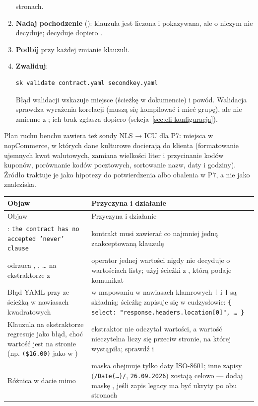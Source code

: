 \begin{enumerate}
        stronach.
  \item \textbf{Nadaj pochodzenie} (): klauzula 
        jest liczona i pokazywana, ale o niczym nie decyduje; decyduje dopiero
        .
  \item \textbf{Podbij } przy każdej zmianie klauzuli.
  \item \textbf{Zwaliduj}:
\begin{lstlisting}
sk validate contract.yaml secondkey.yaml
\end{lstlisting}
        Błąd walidacji wskazuje miejsce (ścieżkę w dokumencie) i powód. Walidacja
         sprawdza wyrażenia korelacji (muszą się kompilować i mieć grupę),
        ale nie zmienne z ; ich brak zgłasza dopiero
         (sekcja~\ref{sec:cli-konfiguracja}).
\end{enumerate}

Plan ruchu benchu zawiera też sondy NLS → ICU dla P7: miejsca w nopCommerce, w których
dane kulturowe docierają do klienta (formatowanie ujemnych kwot walutowych, zamiana
wielkości liter i przycinanie kodów kuponów, porównanie kodów pocztowych, sortowanie
nazw, daty i godziny). Źródło traktuje je jako hipotezy do potwierdzenia albo obalenia w
P7, a nie jako znaleziska.

\begin{xltabular}{\linewidth}{@{}>{\raggedright\arraybackslash}p{5.6cm} >{\raggedright\arraybackslash}X@{}}
\toprule
Objaw & Przyczyna i działanie \\
\midrule
\endfirsthead
\toprule
Objaw & Przyczyna i działanie \\
\midrule
\endhead
{}: \texttt{the contract has no accepted 'never' clause} & kontrakt musi zawierać co najmniej jedną zaakceptowaną klauzulę  \\
 odrzuca , , \ldots{} na ekstraktorze z  & operator jednej wartości nigdy nie decyduje o wartościach listy; użyj ścieżki z \repopath{[*]}, którą podaje komunikat \\
Błąd YAML przy  ze ścieżką w nawiasach kwadratowych & w mapowaniu w nawiasach klamrowych \texttt{[} i \texttt{]} są składnią; ścieżkę zapisuje się w cudzysłowie: \texttt{\{ select: "response.headers.location[0]", \ldots{} \}} \\
Klauzula na ekstraktorze regresuje jako błąd, choć wartość jest na stronie (np. \texttt{(\$16.00)} jako  w ) & ekstraktor nie odczytał wartości, a wartość nieczytelna liczy się przeciw stronie, na której wystąpiła; sprawdź  i  \\
Różnica w dacie mimo  & maska obejmuje tylko daty ISO-8601; inne zapisy (\texttt{/Date(\ldots)/}, \texttt{26.09.2026}) zostają celowo --- dodaj maskę , jeśli zapis legacy ma być ukryty po obu stronach \\
\bottomrule
\end{xltabular}

